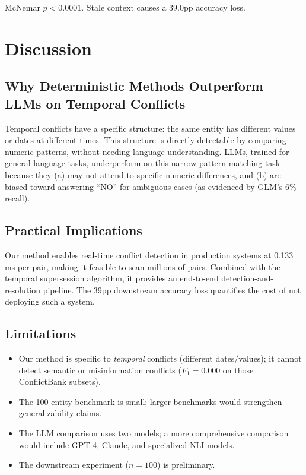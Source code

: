 \documentclass{article}
\begin{document}
McNemar $p < 0.0001$. Stale context causes a 39.0pp accuracy loss.

\section{Discussion}

\subsection{Why Deterministic Methods Outperform LLMs on Temporal Conflicts}

Temporal conflicts have a specific structure: the same entity has different values or dates at different times. This structure is directly detectable by comparing numeric patterns, without needing language understanding. LLMs, trained for general language tasks, underperform on this narrow pattern-matching task because they (a) may not attend to specific numeric differences, and (b) are biased toward answering ``NO'' for ambiguous cases (as evidenced by GLM's 6\% recall).

\subsection{Practical Implications}
Our method enables real-time conflict detection in production systems at 0.133\,ms per pair, making it feasible to scan millions of pairs. Combined with the temporal supersession algorithm, it provides an end-to-end detection-and-resolution pipeline. The 39pp downstream accuracy loss quantifies the cost of not deploying such a system.

\subsection{Limitations}
\begin{itemize}
\item Our method is specific to \emph{temporal} conflicts (different dates/values); it cannot detect semantic or misinformation conflicts ($F_1 = 0.000$ on those ConflictBank subsets).
\item The 100-entity benchmark is small; larger benchmarks would strengthen generalizability claims.
\item The LLM comparison uses two models; a more comprehensive comparison would include GPT-4, Claude, and specialized NLI models.
\item The downstream experiment ($n{=}100$) is preliminary.
\end{itemize}
\end{document}
